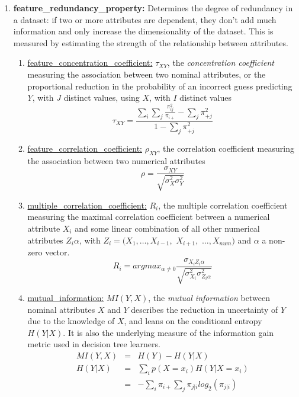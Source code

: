 \documentclass[a4paper,12pt, english]{article}
\begin{document}
\begin{enumerate}
\begin{enumerate}
\begin{enumerate}
\begin{enumerate}
\begin{enumerate}
			\item \textbf{feature\_redundancy\_property:} Determines the degree of redundancy in a dataset: if two or more attributes are dependent, they don't add much information and only increase the dimensionality of the dataset. This is measured by estimating the strength of the relationship between attributes.
				\begin{enumerate}
				\item \underline{feature\_concentration\_coefficient:} $\tau_{XY}$, the \emph{concentration coefficient} measuring the association between two nominal attributes, or the proportional reduction in the probability of an incorrect guess predicting $Y$, with $J$ distinct values, using $X$, with $I$ distinct values \begin{equation} \tau_{XY}=\frac{\sum_{i}\sum_{j}\frac{\pi^{2}_{ij}}{\pi_{i+}}-\sum_{j}\pi^{2}_{+j}}{1-\sum_{j}\pi^{2}_{+j}} \end{equation}
				\item \underline{feature\_correlation\_coefficient:} $\rho_{XY}$, the correlation coefficient measuring the association between two numerical attributes \begin{equation} \rho=\frac{\sigma_{XY}}{\sqrt{\sigma_{X}^{2}\sigma_{Y}^{2}}} \label{eq:rho} \end{equation}
				\item \underline{multiple\_correlation\_coefficient:} $R_{i}$, the multiple correlation coefficient measuring the maximal correlation coefficient between a numerical attribute $X_{i}$ and some linear combination of all other numerical attributes $Z_{i}\alpha$, with $Z_{i}=(X_{1},\ldots,X_{i-1},$ $X_{i+1},$ $\ldots,X_{num})$ and $\alpha$ a non-zero vector. \begin{equation} R_{i}=argmax_{\alpha\neq0} \frac{\sigma_{X_{i}Z_{i}\alpha}} {\sqrt{\sigma_{X_{i}}^{2}\sigma_{Z_{i}\alpha}^{2} } } \end{equation}
				\item \underline{mutual\_information:} $MI(Y,X)$, the \emph{mutual information} between nominal attributes $X$ and $Y$ describes the reduction in uncertainty of $Y$ due to the knowledge of $X$, and leans on the conditional entropy $H(Y|X)$. It is also the underlying measure of the information gain metric used in decision tree learners. \begin{eqnarray} MI(Y,X)&=&H(Y)-H(Y|X) \\ H(Y|X)&=&\sum_{i}p(X=x_{i})H(Y|X=x_{i}) \\ &=&-\sum_{i}\pi_{i+} \sum_{j}\pi_{j|i}log_{2}(\pi_{j|i}) \end{eqnarray}

\end{enumerate}
\end{enumerate}
\end{enumerate}
\end{enumerate}
\end{enumerate}
\end{enumerate}
\end{document}
